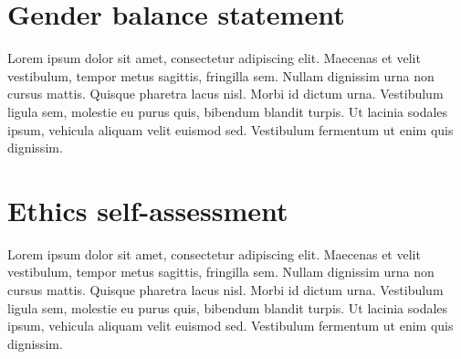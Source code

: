 \section{Gender balance statement}
Lorem ipsum dolor sit amet, consectetur adipiscing elit. Maecenas et velit vestibulum, tempor metus sagittis, fringilla sem. Nullam dignissim urna non cursus mattis. Quisque pharetra lacus nisl. Morbi id dictum urna. Vestibulum ligula sem, molestie eu purus quis, bibendum blandit turpis. Ut lacinia sodales ipsum, vehicula aliquam velit euismod sed. Vestibulum fermentum ut enim quis dignissim.

\section{Ethics self-assessment}

Lorem ipsum dolor sit amet, consectetur adipiscing elit. Maecenas et velit vestibulum, tempor metus sagittis, fringilla sem. Nullam dignissim urna non cursus mattis. Quisque pharetra lacus nisl. Morbi id dictum urna. Vestibulum ligula sem, molestie eu purus quis, bibendum blandit turpis. Ut lacinia sodales ipsum, vehicula aliquam velit euismod sed. Vestibulum fermentum ut enim quis dignissim.


\glsresetall
